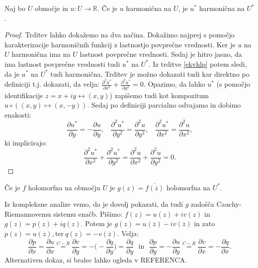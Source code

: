 \documentclass[mat1]{fmfdelo}
\begin{document}
    \begin{lema}
        \label{lemaharm}
        Naj bo $U$ območje in $u: U \to \mathbb{R}$. Če je $u$ harmonična na $U$, je $u^*$ harmonična na $U^*$. 
    \end{lema}
    \begin{proof}
        Trditev lahko dokažemo na dva načina. Dokažimo najprej s pomočjo karakterizacije harmoničnih funkcij z lastnostjo povprečne vrednosti. 
        Ker je $u$ na $U$ harmonična ima na $U$ lastnost povprečne vrednosti.
        Sedaj je hitro jasno, da ima lastnost povprečne vrednosti tudi $u^*$ na $U^*$. 
        Iz trditve \ref{ekvhlp} potem sledi, da je $u^*$ na $U^*$ tudi harmonična.
        \newline
        Trditev je možno dokazati tudi kar direktno po definiciji t.j. dokazati, da velja: $\frac{\partial^2 u^*}{\partial x^2} + \frac{\partial^2 u^*}{\partial y^2} = 0$. 
        Opazimo, da lahko $u^*$ (s pomočjo identifikacije $z = x + iy \leftrightarrow (x,y)$) zapišemo tudi kot kompozitum $u \circ ((x,y) \mapsto (x, -y))$. 
        Sedaj po definiciji parcialno odvajamo in dobimo enakosti:
        $$
            \frac{\partial u^*}{\partial y} = - \frac{\partial u }{\partial y},~~~~\frac{\partial^2 u^*}{\partial y^2} = \frac{\partial^2 u }{\partial y^2},~~~~\frac{\partial^2 u^*}{\partial x^2} = \frac{\partial^2 u }{\partial x^2},
        $$
        ki implicirajo:
        $$
            \frac{\partial^2 u^*}{\partial x^2} + \frac{\partial^2 u^*}{\partial y^2} = \frac{\partial^2 u}{\partial x^2} + \frac{\partial^2 u}{\partial y^2} = 0.
        $$
    \end{proof}
    \begin{lema}
        Če je $f$ holomorfna na območju $U$ je $g(z) = \overline{f({\overline{z}})}$ holomorfna na $U^*$.
    \end{lema}
    \begin{dokaz}
        Iz kompleksne analize vemo, da je dovolj pokazati, da tudi $g$ zadošča Cauchy-Riemannovemu sistemu enačb.
        \newline
        Pišimo: $f(z) = u(z) + iv(z)$ in $g(z) = p(z) + iq(z)$.
        Potem je $g(z) = u(\overline{z}) - iv(\overline{z})$ in zato $p(z) = u(\overline{z}),\text{ter}~q(z) = -v(\overline{z})$. 
        \newline
        Velja:
        \begin{equation*}
            \frac{\partial p}{\partial x} = \frac{\partial u}{\partial x} \overset{C-R}{=} \frac{\partial v}{\partial y} = - \bigg(- \frac{\partial q}{\partial y}\bigg) = \frac{\partial q}{\partial y}~~~\text{in}~~~
            \frac{\partial p}{\partial y} = -\frac{\partial u}{\partial y} \overset{C-R}{=} \frac{\partial v}{\partial x} = -\frac{\partial q}{\partial x}.
        \end{equation*}
        Alternativen dokaz, si bralec lahko ogleda v REFERENCA.
    \end{dokaz}
\end{document}
